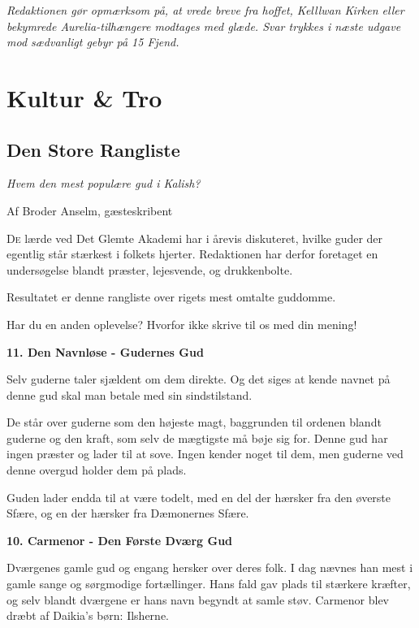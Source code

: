 \documentclass[a4paper,12pt]{memoir}
\newcommand{\deck}[1]{\textsf{\large\itshape #1}}
\newcommand{\byline}[1]{\textsf{\small\color{Gray} Af #1}}
\newcommand{\separator}{%
  \par\noindent{\color{black!40}\rule{\textwidth}{0.4pt}}\par
}
\begin{document}
\par\medskip

\textit{Redaktionen gør opmærksom på, at vrede breve fra hoffet, Kelllwan Kirken eller bekymrede Aurelia-tilhængere modtages med glæde. Svar trykkes i næste udgave mod sædvanligt gebyr på 15 Fjend.}
\separator


\section*{Kultur \& Tro}

\subsection*{\HUGE Den Store Rangliste}
\par\medskip
\deck{Hvem den mest populære gud i Kalish?}
\par\medskip
\byline{Broder Anselm, gæsteskribent}
\medskip

\lettrine[lines=3,lhang=0.1,loversize=0.05]{D}{e} lærde ved Det Glemte Akademi har i årevis diskuteret, hvilke guder der egentlig står stærkest i folkets hjerter. Redaktionen har derfor foretaget en undersøgelse blandt præster, lejesvende, og drukkenbolte.

Resultatet er denne rangliste over rigets mest omtalte guddomme. 

Har du en anden oplevelse? Hvorfor ikke skrive til os med din mening!

\separator
\par\medskip

\textbf{\Large 11. Den Navnløse - Gudernes Gud}
\par

Selv guderne taler sjældent om dem direkte. Og det siges at kende navnet på denne gud skal man betale med sin sindstilstand. 

De står over guderne som den højeste magt, baggrunden til ordenen blandt guderne og den kraft, som selv de mægtigste må bøje sig for. Denne gud har ingen præster og lader til at sove. Ingen kender noget til dem, men guderne ved denne overgud holder dem på plads.

Guden lader endda til at være todelt, med en del der hærsker fra den øverste Sfære, og en der hærsker fra Dæmonernes Sfære.

\par\medskip
\textbf{\Large 10. Carmenor - Den Første Dværg Gud}
\par

Dværgenes gamle gud og engang hersker over deres folk. I dag nævnes han mest i gamle sange og sørgmodige fortællinger. Hans fald gav plads til stærkere kræfter, og selv blandt dværgene er hans navn begyndt at samle støv. Carmenor blev dræbt af Daikia's børn: Ilsherne.
\end{document}
